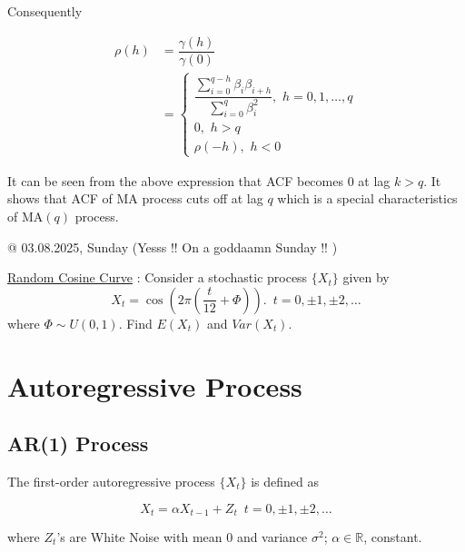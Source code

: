 \documentclass[11pt, a4paper]{article}
\begin{document}
Consequently

\begin{align*}
\rho(h) &= \dfrac{\gamma(h)}{\gamma(0)} \\[0.35em]
&= \begin{cases} 
\dfrac{\sum \limits_{i = 0}^{q - h} \beta_{i}\beta_{i+h}}{\sum \limits_{i = 0}^{q} \beta_{i}^{2}}, \,\, h = 0, 1, \ldots, q \\[1em]
0, \,\, h > q \\[0.5em]
\rho(-h), \,\, h < 0
\end{cases}
\end{align*}

\smallpencil \hspace{0.1cm} It can be seen from the above expression that ACF becomes $0$ at lag $k > q$. It shows that ACF of MA process cuts off at lag $q$ which is a special characteristics of MA$(q)$ process.

\vspace{0.5cm}

\begin{flushright}
\textcolor{col2}{@ 03.08.2025, Sunday (Yesss !! On a goddaamn Sunday !! )}
\end{flushright}

\bclampe \hspace{0.1cm} \underline{Random Cosine Curve} : Consider a stochastic process $\{X_t\}$ given by $$X_t = \cos \left( 2\pi \left( \dfrac{t}{12} + \Phi \right) \right). \,\,\, t = 0, \pm 1, \pm 2, \ldots$$
where $\Phi \sim U(0, 1)$. Find $E(X_t)$ and $Var(X_t)$.

\section{Autoregressive Process}

\subsection{AR(1) Process}

The first-order autoregressive process $\{X_t\}$ is defined as

\begin{equation}\label{ar1}
X_t = \alpha X_{t-1} + Z_t \,\,\, t = 0, \pm 1, \pm 2, \ldots
\end{equation}

where $Z_t$'s are White Noise with mean $0$ and variance $\sigma^2$; $\alpha \in \mathbb{R}$, constant. \\
\end{document}
